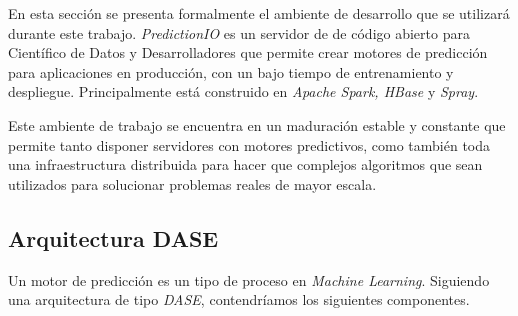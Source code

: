 
  	
En esta sección se presenta formalmente el ambiente de desarrollo que se utilizará durante este trabajo. \emph{PredictionIO} es un servidor de \machinelearning de código abierto para Científico de Datos y Desarrolladores que permite crear motores de predicción para aplicaciones en producción, con un bajo tiempo de entrenamiento y despliegue. Principalmente está construido en \emph{Apache Spark, HBase} y \emph{Spray}. 

Este ambiente de trabajo se encuentra en un maduración estable y constante que permite tanto disponer servidores con motores predictivos, como también toda una infraestructura distribuida para hacer que complejos algoritmos que sean utilizados para solucionar problemas reales de mayor escala.



\subsection{Arquitectura DASE}


Un motor de predicción es un tipo de proceso en \emph{Machine Learning}. Siguiendo una arquitectura de tipo \emph{DASE}, contendríamos los siguientes componentes.




